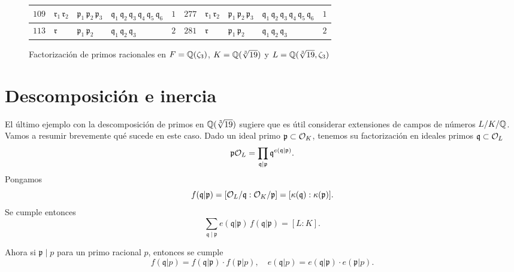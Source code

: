 \begin{figure}
\begin{center}
\begin{tabular}{x{0.75cm}x{1cm}x{1.25cm}x{2.5cm}x{0.75cm}x{0.75cm}x{1cm}x{1.25cm}x{2.5cm}x{0.75cm}}
      \hline
      $109$ & $\mathfrak{r}_1\,\mathfrak{r}_2$ & $\mathfrak{p}_1\,\mathfrak{p}_2\,\mathfrak{p}_3$ & $\mathfrak{q}_1\,\mathfrak{q}_2\,\mathfrak{q}_3\,\mathfrak{q}_4\,\mathfrak{q}_5\,\mathfrak{q}_6$ & $1$ & $277$ & $\mathfrak{r}_1\,\mathfrak{r}_2$ & $\mathfrak{p}_1\,\mathfrak{p}_2\,\mathfrak{p}_3$ & $\mathfrak{q}_1\,\mathfrak{q}_2\,\mathfrak{q}_3\,\mathfrak{q}_4\,\mathfrak{q}_5\,\mathfrak{q}_6$ & $1$ \tabularnewline
      \hline
      $113$ & $\mathfrak{r}$ & $\mathfrak{p}_1\,\mathfrak{p}_2$ & $\mathfrak{q}_1\,\mathfrak{q}_2\,\mathfrak{q}_3$ & $2$ & $281$ & $\mathfrak{r}$ & $\mathfrak{p}_1\,\mathfrak{p}_2$ & $\mathfrak{q}_1\,\mathfrak{q}_2\,\mathfrak{q}_3$ & $2$ \tabularnewline
      \hline
    \end{tabular}
  \end{center}

  \caption{Factorización de primos racionales en $F = \mathbb{Q} (\zeta_3)$, $K = \mathbb{Q} (\sqrt[3]{19})$ y $L = \mathbb{Q} (\sqrt[3]{19}, \zeta_3)$}
  \label{fig:cerradura-de-sqrt-19}
\end{figure}


\section{Descomposición e inercia}

El último ejemplo con la descomposición de primos en $\mathbb{Q} (\sqrt[3]{19})$
sugiere que es útil considerar extensiones de campos de números $L/K/\mathbb{Q}$.
Vamos a resumir brevemente qué sucede en este caso. Dado un ideal primo
$\mathfrak{p} \subset \mathcal{O}_K$, tenemos su factorización en ideales primos
$\mathfrak{q} \subset \mathcal{O}_L$
$$\mathfrak{p}\mathcal{O}_L = \prod_{\mathfrak{q} \mid \mathfrak{p}} \mathfrak{q}^{e (\mathfrak{q}|\mathfrak{p})}.$$
Pongamos
\[ f (\mathfrak{q}|\mathfrak{p})
   = [\mathcal{O}_L/\mathfrak{q} : \mathcal{O}_K/\mathfrak{p}]
   = [\kappa (\mathfrak{q}) : \kappa (\mathfrak{p})]. \]
Se cumple entonces
$$\sum_{\mathfrak{q} \mid \mathfrak{p}} e (\mathfrak{q}|\mathfrak{p}) \, f (\mathfrak{q}|\mathfrak{p}) = [L : K].$$

Ahora si $\mathfrak{p} \mid p$ para un primo racional $p$, entonces se cumple
\[ f (\mathfrak{q}|p) = f (\mathfrak{q}|\mathfrak{p}) \cdot f (\mathfrak{p}|p),
   \quad
   e (\mathfrak{q}|p) = e (\mathfrak{q}|\mathfrak{p}) \cdot e (\mathfrak{p}|p). \]


